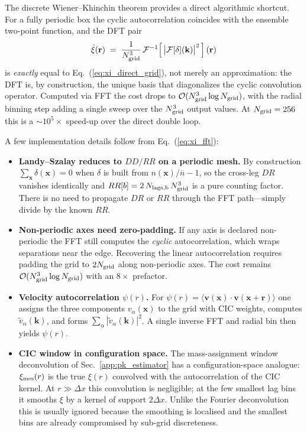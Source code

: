 \documentclass[12pt]{article}
\newcommand{\bx}{\mathbf{x}}
\newcommand{\bk}{\mathbf{k}}
\newcommand{\br}{\mathbf{r}}
\newcommand{\bv}{\mathbf{v}}
\begin{document}
The discrete Wiener--Khinchin theorem provides a direct algorithmic
shortcut.  For a fully periodic box the cyclic autocorrelation
coincides with the ensemble two-point function, and the DFT pair
%
\begin{equation}
  \hat\xi(\br) \;=\;
    \frac{1}{N_{\rm grid}^3}\,
    \mathcal{F}^{-1}\!\left[\,\bigl|\mathcal{F}[\delta](\bk)\bigr|^2\,\right](\br)
  \label{eq:xi_fft}
\end{equation}
%
is \emph{exactly} equal to Eq.~(\ref{eq:xi_direct_grid}), not merely an
approximation: the DFT is, by construction, the unique basis that
diagonalizes the cyclic convolution operator.  Computed via FFT the
cost drops to $\mathcal{O}(N_{\rm grid}^3 \log N_{\rm grid})$, with the
radial binning step adding a single sweep over the $N_{\rm grid}^3$
output values.  At $N_{\rm grid}=256$ this is a $\sim\!10^5\times$
speed-up over the direct double loop.

A few implementation details follow from
Eq.~(\ref{eq:xi_fft}):

\begin{itemize}
  \item \textbf{Landy--Szalay reduces to $DD/RR$ on a periodic mesh.}
    By construction $\sum_\bx \delta(\bx)=0$ when $\delta$ is built
    from $n(\bx)/\bar n - 1$, so the cross-leg $DR$ vanishes identically
    and $RR[b] = 2\,N_{\rm lags,b}\,N_{\rm grid}^3$ is a pure counting
    factor.  There is no need to propagate $DR$ or $RR$ through the FFT
    path---simply divide by the known $RR$.
  \item \textbf{Non-periodic axes need zero-padding.}  If any axis is
    declared non-periodic the FFT still computes the \emph{cyclic}
    autocorrelation, which wraps separations near the edge.  Recovering
    the linear autocorrelation requires padding the grid to
    $2N_{\rm grid}$ along non-periodic axes.  The cost remains
    $\mathcal{O}(N_{\rm grid}^3\log N_{\rm grid})$ with an $8\times$
    prefactor.
  \item \textbf{Velocity autocorrelation $\psi(r)$.}  For
    $\psi(r) = \langle\bv(\bx)\cdot\bv(\bx+\br)\rangle$ one assigns the
    three components $v_\alpha(\bx)$ to the grid with CIC weights,
    computes $\tilde v_\alpha(\bk)$, and forms
    $\sum_\alpha |\tilde v_\alpha(\bk)|^2$.  A single inverse FFT and
    radial bin then yields $\psi(r)$.
  \item \textbf{CIC window in configuration space.}  The mass-assignment
    window deconvolution of Sec.~\ref{app:pk_estimator} has a
    configuration-space analogue: $\xi_{\rm mes}(r)$ is the true
    $\xi(r)$ convolved with the autocorrelation of the CIC kernel.
    At $r \gg \Delta x$ this convolution is negligible; at the few
    smallest lag bins it smooths $\xi$ by a kernel of support $2\Delta
    x$.  Unlike the Fourier deconvolution this is usually ignored
    because the smoothing is localised and the smallest bins are
    already compromised by sub-grid discreteness.
\end{itemize}
\end{document}
